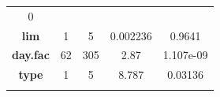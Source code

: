 \documentclass[]{article}
\begin{document}
\begin{longtable}[]{@{}ccccc@{}}
\begin{minipage}[t]{0.12\columnwidth}
0
\strut\end{minipage}\tabularnewline
\begin{minipage}[t]{0.27\columnwidth}\centering\strut
\textbf{lim}
\strut\end{minipage} &
\begin{minipage}[t]{0.10\columnwidth}\centering\strut
1
\strut\end{minipage} &
\begin{minipage}[t]{0.10\columnwidth}\centering\strut
5
\strut\end{minipage} &
\begin{minipage}[t]{0.12\columnwidth}\centering\strut
0.002236
\strut\end{minipage} &
\begin{minipage}[t]{0.12\columnwidth}\centering\strut
0.9641
\strut\end{minipage}\tabularnewline
\begin{minipage}[t]{0.27\columnwidth}\centering\strut
\textbf{day.fac}
\strut\end{minipage} &
\begin{minipage}[t]{0.10\columnwidth}\centering\strut
62
\strut\end{minipage} &
\begin{minipage}[t]{0.10\columnwidth}\centering\strut
305
\strut\end{minipage} &
\begin{minipage}[t]{0.12\columnwidth}\centering\strut
2.87
\strut\end{minipage} &
\begin{minipage}[t]{0.12\columnwidth}\centering\strut
1.107e-09
\strut\end{minipage}\tabularnewline
\begin{minipage}[t]{0.27\columnwidth}\centering\strut
\textbf{type}
\strut\end{minipage} &
\begin{minipage}[t]{0.10\columnwidth}\centering\strut
1
\strut\end{minipage} &
\begin{minipage}[t]{0.10\columnwidth}\centering\strut
5
\strut\end{minipage} &
\begin{minipage}[t]{0.12\columnwidth}\centering\strut
8.787
\strut\end{minipage} &
\begin{minipage}[t]{0.12\columnwidth}\centering\strut
0.03136
\strut\end{minipage}\tabularnewline
\begin{minipage}[t]{0.27\columnwidth}\centering\strut

\end{minipage}
\end{longtable}
\end{document}
